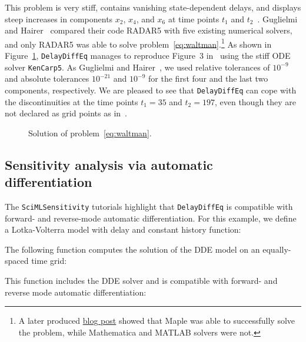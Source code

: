 \documentclass{juliacon}
\def\pkg#1{\texttt{#1}}
\def\alg#1{\texttt{#1}}
\begin{document}
This problem is very stiff, contains vanishing state-dependent delays, and
displays steep increases in components $x_2$, $x_4$, and $x_6$ at time points
$t_1$ and $t_2$~\cite{guglielmi01_implementing_radau,waltman78_threshold_model_antigen}.
Guglielmi and Hairer~\cite{guglielmi01_implementing_radau} compared their code RADAR5
with five existing numerical solvers, and only RADAR5 was able to solve
problem~\eqref{eq:waltman}.\footnote{A later produced \href{https://www.mapleprimes.com/posts/201287-Delay-Differential-Equations--Maple-Is-A-Leader}{blog post} showed that Maple was able to successfully solve the problem, while Mathematica and MATLAB solvers were not.}
As shown in Figure~\ref{fig:waltman}, \pkg{DelayDiffEq} manages
to reproduce Figure~3 in~\cite{guglielmi01_implementing_radau} using the stiff ODE
solver \alg{KenCarp5}. As Guglielmi and Hairer~\cite{guglielmi01_implementing_radau},
we used relative tolerances of $10^{-9}$ and absolute tolerances $10^{-21}$ and
$10^{-9}$ for the first four and the last two components, respectively. We are
pleased to see that \pkg{DelayDiffEq} can cope with the discontinuities at the time points
$t_1 = 35$ and $t_2 = 197$, even though they are not declared as grid points as
in~\cite{guglielmi01_implementing_radau}.

\begin{figure}
    \centering
    
    \caption{Solution of problem~\eqref{eq:waltman}.}
    \label{fig:waltman}
\end{figure}

\subsection{Sensitivity analysis via automatic differentiation}

The \pkg{SciMLSensitivity} tutorials highlight that \pkg{DelayDiffEq} is compatible with forward- and reverse-mode automatic differentiation.
For this example, we define a Lotka-Volterra model with delay and constant history function:



The following function computes the solution of the DDE model on an equally-spaced time grid:



This function includes the DDE solver and is compatible with forward- and reverse mode automatic differentiation:
\end{document}

